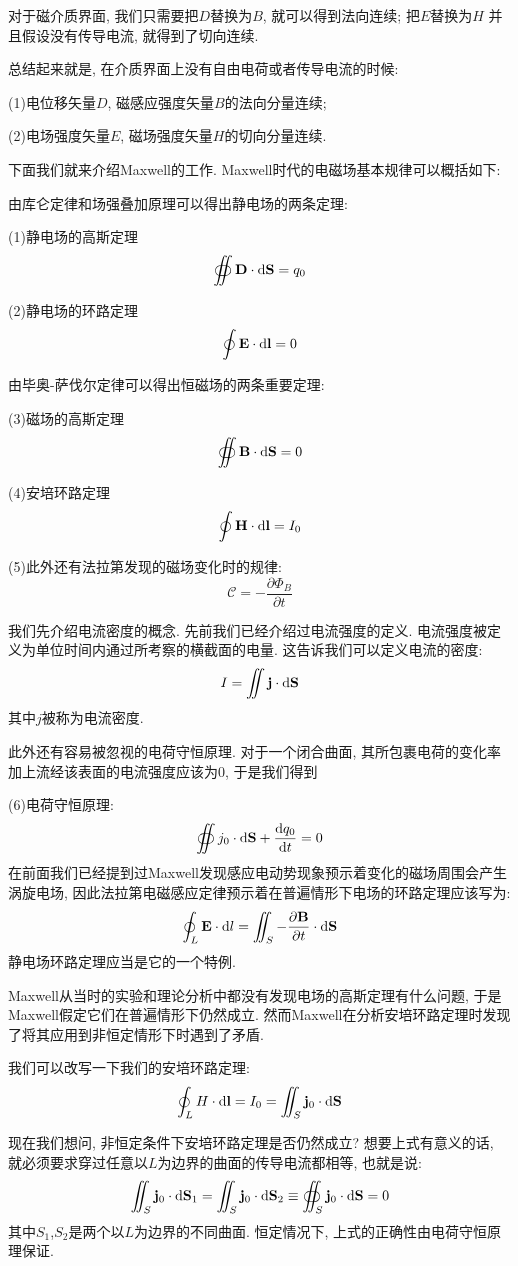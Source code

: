 对于磁介质界面, 我们只需要把$D$替换为$B$, 就可以得到法向连续; 把$E$替换为$H$
并且假设没有传导电流, 就得到了切向连续.

总结起来就是, 在介质界面上没有自由电荷或者传导电流的时候:

(1)电位移矢量$D$, 磁感应强度矢量$B$的法向分量连续;

(2)电场强度矢量$E$, 磁场强度矢量$H$的切向分量连续.

下面我们就来介绍Maxwell的工作. Maxwell时代的电磁场基本规律可以概括如下:

由库仑定律和场强叠加原理可以得出静电场的两条定理:

(1)静电场的高斯定理
\[
\oiint \mathbf{D} \cdot \mathop{}\!\mathrm{d} \mathbf{S} = q_0
\]

(2)静电场的环路定理
\[
\oint \mathbf{E}\cdot \mathop{}\!\mathrm{d} \mathbf{l} = 0
\]

由毕奥-萨伐尔定律可以得出恒磁场的两条重要定理:

(3)磁场的高斯定理
\[
\oiint \mathbf{B} \cdot \mathop{}\!\mathrm{d} \mathbf{S} = 0
\]

(4)安培环路定理
\[
\oint \mathbf{H} \cdot \mathop{}\!\mathrm{d} \mathbf{l} = I_0
\]

(5)此外还有法拉第发现的磁场变化时的规律:
\[
\mathscr C = -\frac{\partial \Phi_B}{\partial t}
\]

我们先介绍电流密度的概念. 先前我们已经介绍过电流强度的定义. 电流强度被定义为单位时间内通过所考察的横截面的电量. 这告诉我们可以定义电流的密度:
\[
I = \iint \mathbf{j}\cdot \mathop{}\!\mathrm{d} \mathbf{S}
\]
其中$j$被称为电流密度.

此外还有容易被忽视的电荷守恒原理. 对于一个闭合曲面, 其所包裹电荷的变化率加上流经该表面的电流强度应该为$0$, 于是我们得到

(6)电荷守恒原理:
\[
\oiint j_0 \cdot \mathop{}\!\mathrm{d} \mathbf{S} +\frac{\mathop{}\!\mathrm{d} q_0}{\mathop{}\!\mathrm{d} t}= 0
\]
在前面我们已经提到过Maxwell发现感应电动势现象预示着变化的磁场周围会产生涡旋电场, 因此法拉第电磁感应定律预示着在普遍情形下电场的环路定理应该写为:
\[
\oint_L \mathbf{E} \cdot \mathop{}\!\mathrm{d} l = \iint_S -\frac{\partial \mathbf{B}}{\partial t} \cdot \mathop{}\!\mathrm{d} \mathbf{S}
\]
静电场环路定理应当是它的一个特例.

Maxwell从当时的实验和理论分析中都没有发现电场的高斯定理有什么问题, 于是Maxwell假定它们在普遍情形下仍然成立. 然而Maxwell在分析安培环路定理时发现了将其应用到非恒定情形下时遇到了矛盾.

我们可以改写一下我们的安培环路定理:
\[
\oint_L H \cdot \mathop{}\!\mathrm{d} \mathbf{l} = I_0 = \iint_S \mathbf{j}_0 \cdot \mathop{}\!\mathrm{d} \mathbf{S}
\]

现在我们想问, 非恒定条件下安培环路定理是否仍然成立? 想要上式有意义的话, 就必须要求穿过任意以$L$为边界的曲面的传导电流都相等, 也就是说:
\[
\iint_S \mathbf{j}_0 \cdot \mathop{}\!\mathrm{d} \mathbf{S}_1 = \iint_S \mathbf{j}_0 \cdot \mathop{}\!\mathrm{d} \mathbf{S}_2 \equiv \oiint_S  \mathbf{j}_0 \cdot \mathop{}\!\mathrm{d} \mathbf{S} =0
\]
其中$S_1$,$S_2$是两个以$L$为边界的不同曲面. 恒定情况下, 上式的正确性由电荷守恒原理保证.

